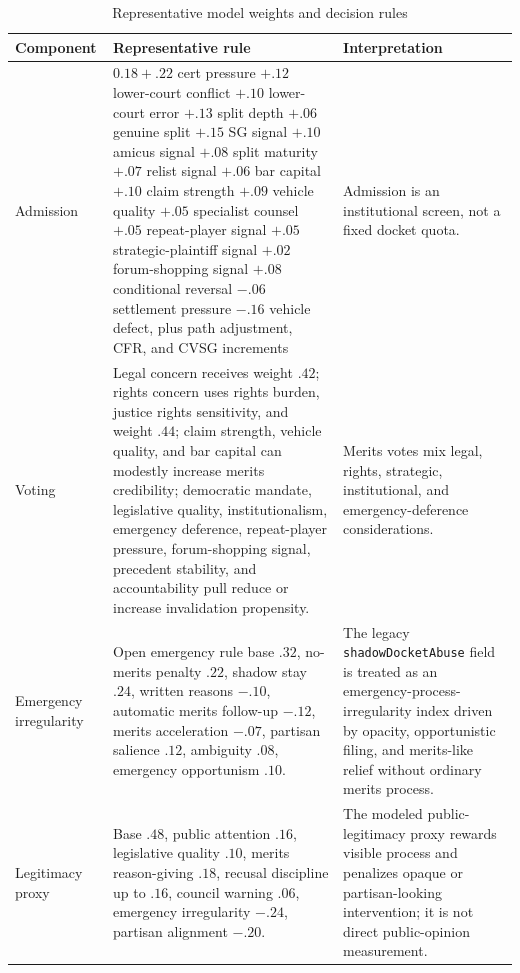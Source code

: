 \documentclass[
    journal=jlc,
    manuscript=research-article,
    year=2026,
  ]{cup-journal}
\providecommand{\Description}[1]{}
\begin{document}
\begin{table}[p]
\centering
\caption{Representative model weights and decision rules}
\label{tab:model-weights}
\Description{Table summarizing representative admission, voting, emergency, conflict, legitimacy, and override weights used by the simulator.}
\scriptsize
\renewcommand{\arraystretch}{0.9}
\begin{tabular}{>{\raggedright\arraybackslash}p{1.05in}>{\raggedright\arraybackslash}p{2.05in}>{\raggedright\arraybackslash}p{1.75in}}
\toprule
Component & Representative rule & Interpretation \\
\midrule
Admission & $0.18 + .22$ cert pressure $+ .12$ lower-court conflict $+ .10$ lower-court error $+ .13$ split depth $+ .06$ genuine split $+ .15$ SG signal $+ .10$ amicus signal $+ .08$ split maturity $+ .07$ relist signal $+ .06$ bar capital $+ .10$ claim strength $+ .09$ vehicle quality $+ .05$ specialist counsel $+ .05$ repeat-player signal $+ .05$ strategic-plaintiff signal $+ .02$ forum-shopping signal $+ .08$ conditional reversal $-.06$ settlement pressure $-.16$ vehicle defect, plus path adjustment, CFR, and CVSG increments & Admission is an institutional screen, not a fixed docket quota. \\
Voting & Legal concern receives weight $.42$; rights concern uses rights burden, justice rights sensitivity, and weight $.44$; claim strength, vehicle quality, and bar capital can modestly increase merits credibility; democratic mandate, legislative quality, institutionalism, emergency deference, repeat-player pressure, forum-shopping signal, precedent stability, and accountability pull reduce or increase invalidation propensity. & Merits votes mix legal, rights, strategic, institutional, and emergency-deference considerations. \\
Emergency irregularity & Open emergency rule base $.32$, no-merits penalty $.22$, shadow stay $.24$, written reasons $-.10$, automatic merits follow-up $-.12$, merits acceleration $-.07$, partisan salience $.12$, ambiguity $.08$, emergency opportunism $.10$. & The legacy \texttt{shadowDocketAbuse} field is treated as an emergency-process-irregularity index driven by opacity, opportunistic filing, and merits-like relief without ordinary merits process. \\
Legitimacy proxy & Base $.48$, public attention $.16$, legislative quality $.10$, merits reason-giving $.18$, recusal discipline up to $.16$, council warning $.06$, emergency irregularity $-.24$, partisan alignment $-.20$. & The modeled public-legitimacy proxy rewards visible process and penalizes opaque or partisan-looking intervention; it is not direct public-opinion measurement. \\

\end{tabular}
\end{table}
\end{document}
